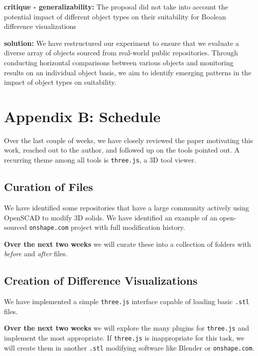 \documentclass[sigconf,authorversion,nonacm]{acmart}
\begin{document}
\begin{enumerate}
\begin{description}
		      \item \textbf{critique - generalizability:} The proposal did not take into account the potential impact of different object types on their suitability for Boolean difference visualizations
		      \item \textbf{solution:} We have restructured our experiment to ensure that we evaluate a diverse array of objects sourced from real-world public repositories. Through conducting horizontal comparisons between various objects and monitoring results on an individual object basis, we aim to identify emerging patterns in the impact of object types on suitability.
	      \end{description}
\end{enumerate}

\section{Appendix B: Schedule}

Over the last couple of weeks, we have closely reviewed the paper motivating this work, reached out to the author, and followed up on the tools pointed out. A recurring theme among all tools is \texttt{three.js}, a 3D tool viewer.


\subsection{Curation of Files}

We have identified some repositories that have a large community actively using OpenSCAD to modify 3D solids. We have identified an example of an open-sourced \texttt{onshape.com} project with full modification history.

\textbf{Over the next two weeks} we will curate these into a collection of folders with \emph{before} and \emph{after} files.

\subsection{Creation of Difference Visualizations}

We have implemented a simple \texttt{three.js} interface capable of loading basic \texttt{.stl} files.

\textbf{Over the next two weeks} we will explore the many plugins for \texttt{three.js} and implement the most appropriate. If \texttt{three.js} is inappropriate for this task, we will create them in another \texttt{.stl} modifying software like Blender or \texttt{onshape.com}.


\end{document}
